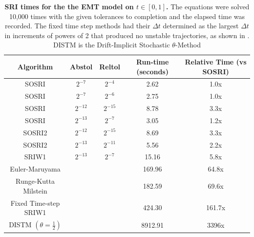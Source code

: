 \documentclass{article}
\begin{document}
\begin{center}
	\begin{table}
		\begin{centering}
			{\footnotesize
			\begin{tabular}{|c|c|c|c|c|}
				\hline
				Algorithm & Abstol & Reltol & Run-time (seconds) & Relative Time (vs SOSRI)\tabularnewline
				\hline
				\hline
				SOSRI & $2^{-7}$ & $2^{-4}$ & 2.62 & 1.0x\tabularnewline
				\hline
				SOSRI & $2^{-7}$ & $2^{-6}$ & 2.75 & 1.0x\tabularnewline
				\hline
				SOSRI & $2^{-12}$ & $2^{-15}$ & 8.78 & 3.3x\tabularnewline
				\hline
				SOSRI & $2^{-13}$ & $2^{-7}$ & 3.05 & 1.2x\tabularnewline
				\hline
				SOSRI2 & $2^{-12}$ & $2^{-15}$ & 8.69 & 3.3x\tabularnewline
				\hline
				SOSRI2 & $2^{-13}$ & $2^{-11}$ & 5.56 & 2.2x\tabularnewline
				\hline
				SRIW1 & $2^{-13}$ & $2^{-7}$ & 15.16 & 5.8x\tabularnewline
				\hline
				Euler-Maruyama &  &  & 169.96 & 64.8x\tabularnewline
				\hline
				Runge-Kutta Milstein &  &  & 182.59 & 69.6x\tabularnewline
				\hline
				Fixed Time-step SRIW1 &  &  & 424.30 & 161.7x\tabularnewline
				\hline
				DISTM $\left(\theta=\frac{1}{2}\right)$ &  &  & 8912.91 & 3396x\tabularnewline
				\hline
			\end{tabular}
			}%
			\par\end{centering}
		\caption{\textbf{SRI times for the the EMT model on $t\in\left[0,1\right]$.}
			The equations were solved 10,000 times with the given tolerances to
			completion and the elapsed time was recorded. The fixed time step
			methods had their $\Delta t$ determined as the largest $\Delta t$
			in increments of powers of 2 that produced no unstable trajectories,
			as shown in \cite{RN3787}. DISTM is the Drift-Implicit Stochastic
			$\theta$-Method\label{tab:SRI-times-for-Oval2} }
	\end{table}
	\par\end{center}
\end{document}
